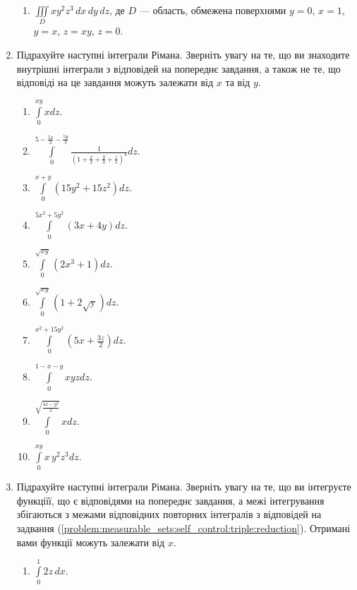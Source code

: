 \begin{enumerate}
\begin{enumerate}[label*=\arabic*.]
        \item $\iiint\limits_D x y^{2} z^{3} \,dx\,dy\,dz$, де $D$ --- область, обмежена поверхнями  ${y = 0}$, ${x = 1}$, ${y = x}$, ${z = {x y}}$, ${z = 0}$.
    \end{enumerate}
\item \label{problem:measurable_sets:self_control:triple:inner}Підрахуйте наступні інтеграли Рімана. Зверніть увагу на те, що ви знаходите внутрішні інтеграли з відповідей на попереднє завдання, а також не те, що відповіді на це завдання можуть залежати від $x$ та від $y$.
\begin{multicols}{2}
    \begin{enumerate}[label*=\arabic*.]
        \item $\int\limits_{0}^{x y}xd z$.
        \item $\int\limits_{0}^{5-\frac{5 x}{2}-\frac{5 y}{3}}\frac{1}{\left(1+\frac{x}{2}+\frac{y}{3}+\frac{z}{5}\right)^{4}}d z$.
        \item $\int\limits_{0}^{x+y}\left(15 y^{2}+15 z^{2}\right)d z$.
        \item $\int\limits_{0}^{5 x^{2}+5 y^{2}}\left(3 x+4 y\right)d z$.
        \item $\int\limits_{0}^{\sqrt{x y}}\left(2 x^{3}+1\right)d z$.
        \item $\int\limits_{0}^{\sqrt{x y}}\left(1+2 \mathrm{\sqrt{y}}\right)d z$.
        \item $\int\limits_{0}^{x^{2}+15 y^{2}}\left(5 x+\frac{3 z}{2}\right)d z$.
        \item $\int\limits_{0}^{1-x-y} x y z d z$.
        \item $\int\limits_{0}^{\sqrt{\frac{4 x - y^2}{2}}}xd z$.
        \item $\int\limits_{0}^{x y}x \,y^{2} z^{3}d z$.
    \end{enumerate}
\end{multicols}
\item\label{problem:measurable_sets:self_control:triple:middle} Підрахуйте наступні інтеграли Рімана. Зверніть увагу на те, що ви інтегруєте функціїї, що є відповідями на попереднє завдання, а межі інтегрування збігаються з межами відповідних повторних інтегралів з відповідей на задвання (\ref{problem:measurable_sets:self_control:triple:reduction}). Отримані вами функції можуть залежати від $x$.
\begin{multicols}{2}
    \begin{enumerate}[label*=\arabic*.]
        \item $\int\limits_0^1 2z \,dx$.

\end{enumerate}
\end{multicols}
\end{enumerate}

